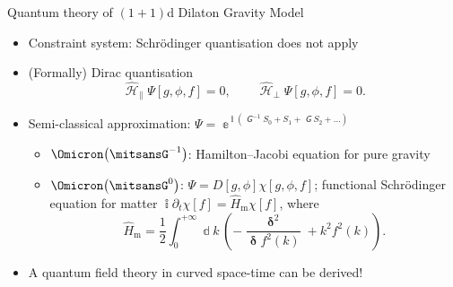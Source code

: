 \documentclass{beamer}
\newcommand{\ii}{{\Bbbi}}
\newcommand{\ee}{{\Bbbe}}
\newcommand{\rbr}[1]{{\left(#1\right)}}
\newcommand{\rfun}[2]{{#1}\mathopen{}\left(#2\right)\mathclose{}}
\newcommand{\sfun}[2]{{#1}\mathopen{}\left[#2\right]\mathclose{}}
\newcommand{\dd}{\Bbbd}
\newcommand{\what}[1]{{\widehat{#1}}}
\newcommand{\nG}{\mitsansG} %
\begin{document}
\begin{frame}[allowframebreaks]{Quantum theory of $\rbr{1+1}$d Dilaton Gravity 
Model}{%
}

\begin{itemize}
\item Constraint system: Schrödinger quantisation does not apply
\item (Formally) Dirac quantisation
\begin{equation}
 \what{\mscrH}_\parallel \sfun{\Psi}{g,\phi,f} = 0, \qquad
 \what{\mscrH}_\perp  \sfun{\Psi}{g,\phi,f} = 0.
\end{equation}




\item Semi-classical approximation: $\Psi = \ee^{\ii\rbr{\nG^{-1}S_0 + 
S_1 + \nG S_2 + \ldots}}$

\begin{itemize}
\item $\rfun{\Omicron}{\nG^{-1}}$: Hamilton--Jacobi equation for pure gravity
\item $\rfun{\Omicron}{\nG^0}$: $\Psi = \sfun{D}{g, \phi}
\sfun{\chi}{g, \phi, f}$; functional \alert{Schrödinger equation for matter}
$\ii \partial_t\sfun{\chi}{f} = \what{H}_\text{m} \sfun{\chi}{f}$, where
\begin{equation}
\what{H}_\text{m} = \frac{1}{2}\int_{0}^{+\infty} \dd k\,
\rbr{-\frac{\mbfdelta^2}{\mbfdelta \rfun{f^2}{k}} + k^2 \rfun{f^2}{k}}.
\end{equation}
\end{itemize}
\item A quantum field theory in curved space-time can be \alert{derived}!


\end{itemize}
\end{frame}
\end{document}
